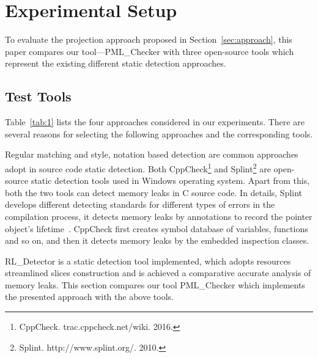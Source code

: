 \section{Experimental Setup}\label{sec:setup}
To evaluate the projection approach proposed in Section~\ref{sec:approach}, 
this paper compares our tool---PML\_Checker with three open-source tools which represent the existing different static detection approaches. 
\subsection{Test Tools}\label{ssec:tool}
Table~\ref{tab:1} lists the four approaches considered in our experiments. There are several reasons for selecting the following approaches and the corresponding tools. 

Regular matching and style, notation based detection are common approaches adopt in source code static detection. Both CppCheck\footnote{CppCheck. trac.cppcheck.net/wiki. 2016.} and Splint\footnote{Splint. http://www.splint.org/. 2010.} are open-source static detection tools used in Windows operating system. Apart from this, both the two tools can detect memory leaks in C source code. In details, Splint develops different detecting standards for different types of errors in the compilation process, it detects memory leaks by annotations to record the pointer object’s lifetime~\cite{EL02}. CppCheck first creates symbol database of variables, functions and so on, and then it detects memory leaks by the embedded inspection classes.
 
RL\_Detector is a static detection tool implemented, which adopts resources streamlined slices construction and is achieved a comparative accurate analysis of memory leaks. This section compares our tool PML\_Checker which implements the presented approach with the above tools.
